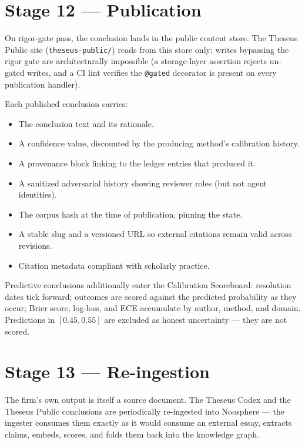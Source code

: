 \documentclass[11pt,letterpaper]{article}
\newcommand{\file}[1]{\texttt{#1}}
\begin{document}
\section{Stage 12 --- Publication}

On rigor-gate pass, the conclusion lands in the public content store. The Theseus Public site (\file{theseus-public/}) reads from this store only; writes bypassing the rigor gate are architecturally impossible (a storage-layer assertion rejects un-gated writes, and a CI lint verifies the \texttt{@gated} decorator is present on every publication handler).

Each published conclusion carries:

\begin{itemize}[leftmargin=1.5em,itemsep=0.1em]
\item The conclusion text and its rationale.
\item A confidence value, discounted by the producing method's calibration history.
\item A provenance block linking to the ledger entries that produced it.
\item A sanitized adversarial history showing reviewer roles (but not agent identities).
\item The corpus hash at the time of publication, pinning the state.
\item A stable slug and a versioned URL so external citations remain valid across revisions.
\item Citation metadata compliant with scholarly practice.
\end{itemize}

Predictive conclusions additionally enter the Calibration Scoreboard: resolution dates tick forward; outcomes are scored against the predicted probability as they occur; Brier score, log-loss, and ECE accumulate by author, method, and domain. Predictions in $[0.45, 0.55]$ are excluded as honest uncertainty --- they are not scored.

\section{Stage 13 --- Re-ingestion}

The firm's own output is itself a source document. The Theseus Codex and the Theseus Public conclusions are periodically re-ingested into Noosphere --- the ingester consumes them exactly as it would consume an external essay, extracts claims, embeds, scores, and folds them back into the knowledge graph.
\end{document}
